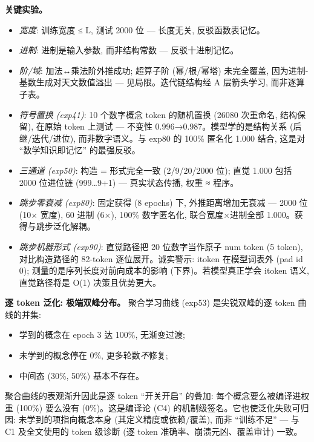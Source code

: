 \documentclass[
]{article}
\providecommand{\tightlist}{%
  \setlength{\itemsep}{0pt}\setlength{\parskip}{0pt}}
\begin{document}
\textbf{关键实验。}

\begin{itemize}
\tightlist
\item
  \emph{宽度}: 训练宽度 ≤ L, 测试 2000 位 --- 长度无关, 反驳函数表记忆。
\item
  \emph{进制}: 进制是输入参数, 而非结构常数 --- 反驳十进制记忆。
\item
  \emph{阶/域}: 加法↔乘法阶外推成功; 超算子阶 (幂/根/幂塔) 未完全覆盖,
  因为进制-基数生成对天文数值溢出 --- 见局限。迭代链结构经 A 层箭头学习,
  而非逐算子表。
\item
  \emph{符号置换 (exp41)}: 10 个数字概念 token 的随机置换 (26080
  次重命名, 结构保留), 在原始 token 上测试 --- 不变性
  0.996→0.987。模型学的是结构关系 (后继/迭代/进位), 而非数字语义。与
  exp80 的 100\% 匿名化 1.000 结合, 这是对 ``数学知识即记忆''
  的最强反驳。
\item
  \emph{三通道 (exp50)}: 构造 = 形式完全一致 (2/9/20/2000 位); 直觉
  1.000 包括 2000 位进位链 (999\ldots9+1) --- 真实状态传播, 权重 ≈
  程序。
\item
  \emph{跳步零衰减 (exp80)}: 固定获得 (8 epochs) 下, 外推距离增加无衰减
  --- 2000 位 (10× 宽度), 60 进制 (6×), 100\% 数字匿名化,
  联合宽度×进制全部 1.000。获得与跳步泛化解耦。
\item
  \emph{跳步机器形式 (exp90)}: 直觉路径把 20 位数字当作原子 num token (5
  token), 对比构造路径的 82-token 逐位展开。诚实警示: itoken
  在模型词表外 (pad id 0); 测量的是序列长度对前向成本的影响
  (下界)。若模型真正学会 itoken 语义, 直觉路径将是 O(1) 决策且优势更大。
\end{itemize}

\textbf{逐 token 泛化: 极端双峰分布。} 聚合学习曲线 (exp53)
是尖锐双峰的逐 token 曲线的并集:

\begin{itemize}
\tightlist
\item
  学到的概念在 epoch 3 达 100\%, 无渐变过渡;
\item
  未学到的概念停在 0\%, 更多轮数\emph{不}修复;
\item
  中间态 (30\%, 50\%) 基本不存在。
\end{itemize}

聚合曲线的表观渐升因此是逐 token ``开关开启'' 的叠加:
每个概念要么被编译进权重 (100\%) 要么没有 (0\%)。这是编译论 (C4)
的机制级签名。它也使泛化失败可归因: 未学到的项指向概念本身
(其定义精度或依赖/覆盖), 而非 ``训练不足'' --- 与 C1 及全文使用的 token
级诊断 (逐 token 准确率、崩溃元凶、覆盖审计) 一致。
\end{document}
